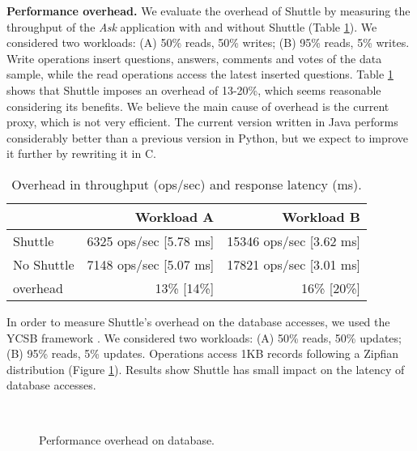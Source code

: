 \textbf{Performance overhead.}
We evaluate the overhead of Shuttle by measuring the throughput of the \textit{Ask} application with and without Shuttle (Table \ref{tab:throughput}). We considered two workloads: (A) 50\% reads, 50\% writes;  (B)  95\% reads, 5\% writes. Write operations insert questions, answers, comments and votes of the data sample, while the read operations access the latest inserted questions. Table \ref{tab:throughput} shows that Shuttle imposes an overhead of 13-20\%, which seems reasonable considering its benefits. We believe the main cause of overhead is the current proxy, which is not very efficient. The current version written in Java performs considerably better than a previous version in Python, but we expect to improve it further by rewriting it in C.

\begin{table}
\footnotesize
\begin{tabular}{l|rr}
                       &  Workload A                    & Workload B  \\ \hline
Shuttle                &  6325 ops/sec [5.78 ms]        &  15346 ops/sec [3.62 ms]  \\
No Shuttle             &  7148 ops/sec [5.07 ms]        &  17821 ops/sec [3.01 ms]  \\
overhead               &  13\% [14\%]                    & 16\% [20\%] \\
\end{tabular}
\caption{Overhead in throughput (ops/sec) and response latency (ms).}
\label{tab:throughput}
\vspace{-3mm}
\end{table}

In order to measure Shuttle's overhead on the database accesses, we used the \acf{YCSB} framework \cite{ycsb}. We considered two workloads: (A)  50\% reads, 50\% updates; (B)  95\% reads, 5\% updates. Operations access 1KB records following a Zipfian distribution (Figure \ref{fig:database_overhead}). Results show Shuttle has small impact on the latency of database accesses. 

\begin{figure}[tbh]
\vspace{-6mm}
\hspace*{-0.5cm}
  \LARGE
  \mbox{
  }
  \caption{Performance overhead on database.}
  \vspace{-2mm}
  \label{fig:database_overhead}
\end{figure}


